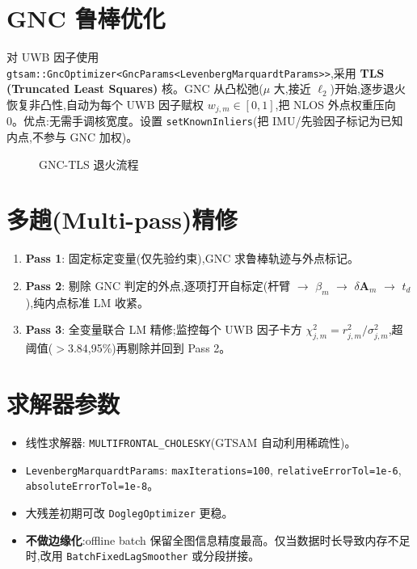 \documentclass[11pt,a4paper]{report}
\newcommand{\bA}{\bm{A}}
\begin{document}
\section{GNC 鲁棒优化}
对 UWB 因子使用 \texttt{gtsam::GncOptimizer<GncParams<LevenbergMarquardtParams>>},采用 \textbf{TLS (Truncated Least Squares)} 核。GNC 从凸松弛($\mu$ 大,接近 $\ell_2$)开始,逐步退火恢复非凸性,自动为每个 UWB 因子赋权 $w_{j,m}\in[0,1]$,把 NLOS 外点权重压向 0。优点:无需手调核宽度。设置 \texttt{setKnownInliers}(把 IMU/先验因子标记为已知内点,不参与 GNC 加权)。

\begin{figure}[ht]
\centering
{}
\caption{GNC-TLS 退火流程}
\label{fig:gnc}
\end{figure}

\section{多趟(Multi-pass)精修}
\begin{enumerate}[leftmargin=2em]
  \item \textbf{Pass 1}: 固定标定变量(仅先验约束),GNC 求鲁棒轨迹与外点标记。
  \item \textbf{Pass 2}: 剔除 GNC 判定的外点,逐项打开自标定(杆臂 $\to$ $\beta_m$ $\to$ $\delta\bA_m$ $\to$ $t_d$),纯内点标准 LM 收紧。
  \item \textbf{Pass 3}: 全变量联合 LM 精修;监控每个 UWB 因子卡方 $\chi^2_{j,m}=r_{j,m}^2/\sigma_{j,m}^2$,超阈值($>3.84$,95\%)再剔除并回到 Pass 2。
\end{enumerate}

\section{求解器参数}
\begin{itemize}[leftmargin=2em]
  \item 线性求解器: \texttt{MULTIFRONTAL\_CHOLESKY}(GTSAM 自动利用稀疏性)。
  \item \texttt{LevenbergMarquardtParams}: \texttt{maxIterations=100}, \texttt{relativeErrorTol=1e-6}, \texttt{absoluteErrorTol=1e-8}。
  \item 大残差初期可改 \texttt{DoglegOptimizer} 更稳。
  \item \textbf{不做边缘化}:offline batch 保留全图信息精度最高。仅当数据时长导致内存不足时,改用 \texttt{BatchFixedLagSmoother} 或分段拼接。
\end{itemize}
\end{document}
